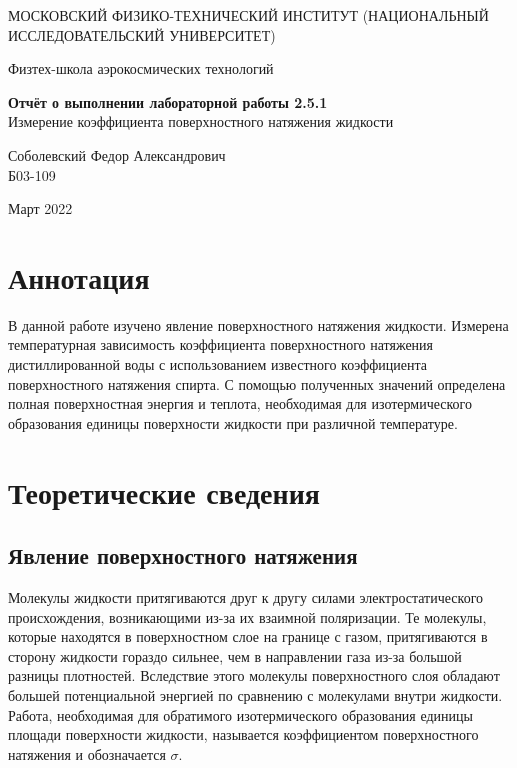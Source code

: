 \documentclass[a4paper,12pt]{article} %
\date{\today}
\begin{document}
\begin{titlepage}
	\begin{center}
		{\large МОСКОВСКИЙ ФИЗИКО-ТЕХНИЧЕСКИЙ ИНСТИТУТ (НАЦИОНАЛЬНЫЙ ИССЛЕДОВАТЕЛЬСКИЙ УНИВЕРСИТЕТ)}
	\end{center}
	\begin{center}
		{\large Физтех-школа аэрокосмических технологий}
	\end{center}
	
	
	\vspace{4.5cm}
	{\huge
		\begin{center}
			{\bf Отчёт о выполнении лабораторной работы 2.5.1}\\
			Измерение коэффициента поверхностного натяжения жидкости
		\end{center}
	}
	\vspace{1cm}
	\begin{center}
		{\large Соболевский Федор Александрович \\
			\vspace{0.2cm}
			Б03-109}
	\end{center}
	\vspace{8cm}
	\begin{center}
		Март 2022
	\end{center}
\end{titlepage}

\section{Аннотация}

В данной работе изучено явление поверхностного натяжения жидкости. Измерена температурная зависимость коэффициента поверхностного натяжения дистиллированной воды с использованием известного коэффициента поверхностного натяжения спирта. С помощью полученных значений определена полная поверхностная энергия и теплота, необходимая для изотермического образования единицы поверхности жидкости при различной температуре.

\section{Теоретические сведения}

\subsection{Явление поверхностного натяжения}

Молекулы жидкости притягиваются друг к другу силами электростатического происхождения, возникающими из-за их взаимной поляризации. Те молекулы, которые находятся в поверхностном слое на границе с газом, притягиваются
в сторону жидкости гораздо сильнее, чем в направлении газа из-за большой разницы плотностей. Вследствие этого молекулы поверхностного слоя обладают большей потенциальной энергией по сравнению с молекулами внутри жидкости. Работа, необходимая для обратимого изотермического образования единицы площади поверхности жидкости, называется коэффициентом поверхностного натяжения и обозначается $\sigma$.
\end{document}
